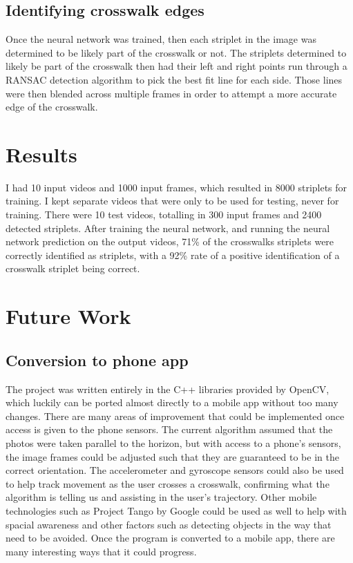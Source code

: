 \documentclass[12pt]{ucthesis}
\begin{document}
\section{Identifying crosswalk edges}
Once the neural network was trained, then each striplet in the image was determined to be likely part of the crosswalk or not. The striplets determined to likely be part of the crosswalk then had their left and right points run through a RANSAC detection algorithm to pick the best fit line for each side. 
Those lines were then blended across multiple frames in order to attempt a more accurate edge of the crosswalk. 

\chapter{Results}
\label{results}


I had  10 input videos and 1000 input frames, which resulted in 8000 striplets for training. I kept separate videos that were only to be used for testing, never for training. There were 10 test videos, totalling in 300 input frames and 2400 detected striplets. After training the neural network, and running the neural network prediction on the output videos, 71\% of the crosswalks striplets were correctly identified as striplets, with a 92\% rate of a positive identification of a crosswalk striplet being correct. 


\chapter{Future Work}
\label{future work}

\section{Conversion to phone app}

The project was written entirely in the C++ libraries provided by OpenCV, which luckily can be ported almost directly to a mobile app without too many changes. There are many areas of improvement that could be implemented once access is given to the phone sensors. The current algorithm assumed that the photos were taken parallel to the horizon, but with access to a phone's sensors, the image frames could be adjusted such that they are guaranteed to be in the correct orientation. The accelerometer and gyroscope sensors could also be used to help track movement as the user crosses a crosswalk, confirming what the algorithm is telling us and assisting in the user's trajectory. Other mobile technologies such as Project Tango by Google \cite{projectTango} could be used as well to help with spacial awareness and other factors such as detecting objects in the way that need to be avoided. Once the program is converted to a mobile app, there are many interesting ways that it could progress.
\end{document}
